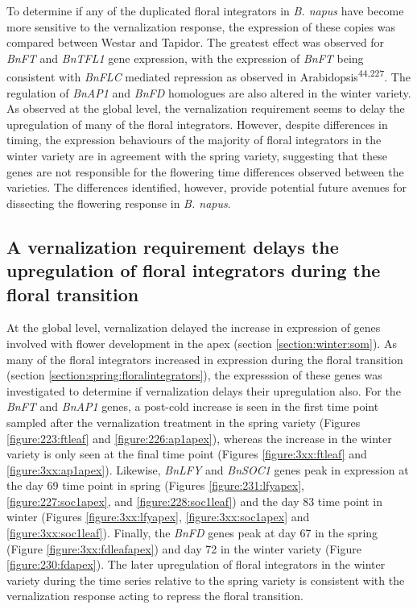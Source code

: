 \documentclass[12pt,]{book}
\begin{document}
To determine if any of the duplicated floral integrators in \emph{B.
napus} have become more sensitive to the vernalization response, the
expression of these copies was compared between Westar and Tapidor. The
greatest effect was observed for \emph{BnFT} and \emph{BnTFL1} gene
expression, with the expression of \emph{BnFT} being consistent with
\emph{BnFLC} mediated repression as observed in
Arabidopsis\textsuperscript{44,227}. The regulation of \emph{BnAP1} and
\emph{BnFD} homologues are also altered in the winter variety. As
observed at the global level, the vernalization requirement seems to
delay the upregulation of many of the floral integrators. However,
despite differences in timing, the expression behaviours of the majority
of floral integrators in the winter variety are in agreement with the
spring variety, suggesting that these genes are not responsible for the
flowering time differences observed between the varieties. The
differences identified, however, provide potential future avenues for
dissecting the flowering response in \emph{B. napus}.

\subsection{A vernalization requirement delays the upregulation of
floral integrators during the floral
transition}\label{section:winter:floraldelay}

At the global level, vernalization delayed the increase in expression of
genes involved with flower development in the apex (section
\ref{section:winter:som}). As many of the floral integrators increased
in expression during the floral transition (section
\ref{section:spring:floralintegrators}), the expresssion of these genes
was investigated to determine if vernalization delays their upregulation
also. For the \emph{BnFT} and \emph{BnAP1} genes, a post-cold increase
is seen in the first time point sampled after the vernalization
treatment in the spring variety (Figures \ref{figure:223:ftleaf} and
\ref{figure:226:ap1apex}), whereas the increase in the winter variety is
only seen at the final time point (Figures \ref{figure:3xx:ftleaf} and
\ref{figure:3xx:ap1apex}). Likewise, \emph{BnLFY} and \emph{BnSOC1}
genes peak in expression at the day 69 time point in spring (Figures
\ref{figure:231:lfyapex}, \ref{figure:227:soc1apex}, and
\ref{figure:228:soc1leaf}) and the day 83 time point in winter (Figures
\ref{figure:3xx:lfyapex}, \ref{figure:3xx:soc1apex} and
\ref{figure:3xx:soc1leaf}). Finally, the \emph{BnFD} genes peak at day
67 in the spring (Figure \ref{figure:3xx:fdleafapex}) and day 72 in the
winter variety (Figure \ref{figure:230:fdapex}). The later upregulation
of floral integrators in the winter variety during the time series
relative to the spring variety is consistent with the vernalization
response acting to repress the floral transition.
\end{document}
